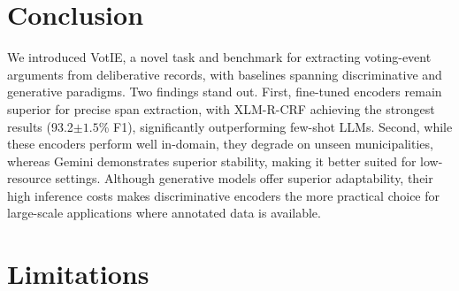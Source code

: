 \documentclass[11pt]{article}
\begin{document}
\section{Conclusion}
\label{sec:conclusion}
We introduced VotIE, a novel task and benchmark for extracting voting-event arguments from deliberative records, with baselines spanning discriminative and generative paradigms. Two findings stand out. First, fine-tuned encoders remain superior for precise span extraction, with XLM-R-CRF achieving the strongest results (93.2${\pm 1.5}$\% F1), significantly outperforming few-shot LLMs. Second, while these encoders perform well in-domain, they degrade on unseen municipalities, whereas Gemini demonstrates superior stability, making it better suited for low-resource settings. Although generative models offer superior adaptability, their high inference costs makes discriminative encoders the more practical choice for large-scale applications where annotated data is available.

\section{Limitations}
\label{sec:limitations}

\end{document}
